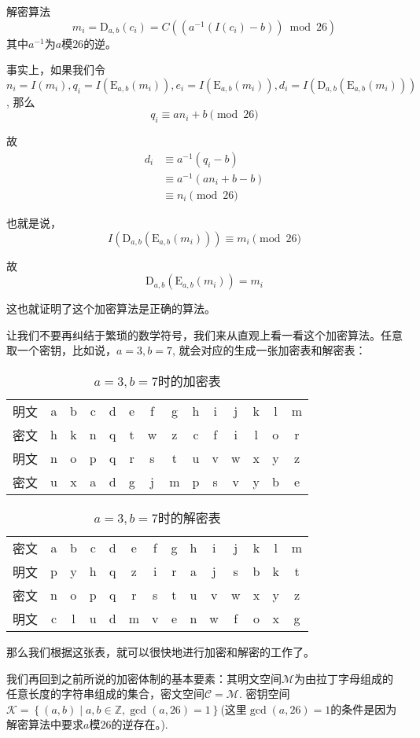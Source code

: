 \documentclass[UTF8]{ctexrep}
\newcommand{\Z}{\mathbb{Z}}
\def\pth#1{\left( {#1}\right)}
\def\brace#1{\left\{ {#1} \right\}}
\def\E#1#2{{\mathrm{E}_{#1}\left({#2}\right)}}
\def\D#1#2{{\mathrm{D}_{#1}\left({#2}\right)}}
\begin{document}
解密算法
\[m_i=\D{a, b}{c_i}=C\pth{\pth{a^{-1}\pth{I\pth{c_i}-b}}\bmod{26}}\]
其中$a^{-1}$为$a$模$26$的逆。\par
事实上，如果我们令$n_i=I\pth{m_i}, q_i=I\pth{\E{a, b}{m_i}}, e_i=I\pth{\E{a, b}{m_i}}, d_i=I\pth{\D{a, b}{\E{a, b}{m_i}}}$, 那么
\[q_i\equiv an_i+b\pmod{26}\]

故
\begin{align*}
    d_i&\equiv a^{-1}\pth{q_i-b}\\
    &\equiv a^{-1}\pth{an_i+b-b}\\
    &\equiv n_i\pmod{26}
\end{align*}

也就是说，
\[I\pth{\D{a, b}{\E{a, b}{m_i}}}\equiv m_i\pmod{26}\]

故
\[\D{a, b}{\E{a, b}{m_i}}=m_i\]

这也就证明了这个加密算法是正确的算法。\par
让我们不要再纠结于繁琐的数学符号，我们来从直观上看一看这个加密算法。任意取一个密钥，比如说，$a=3, b=7$, 就会对应的生成一张加密表和解密表：
\begin{table}[H]
    \centering
    \caption{$a=3, b=7$时的加密表}
    \begin{tabular}{c|c|c|c|c|c|c|c|c|c|c|c|c|c}\hline
        明文&a&b&c&d&e&f&g&h&i&j&k&l&m\\
        密文&h&k&n&q&t&w&z&c&f&i&l&o&r\\\hline
        明文&n&o&p&q&r&s&t&u&v&w&x&y&z\\
        密文&u&x&a&d&g&j&m&p&s&v&y&b&e\\\hline
    \end{tabular}
\end{table}
\begin{table}[H]
    \centering
    \caption{$a=3, b=7$时的解密表}
    \begin{tabular}{c|c|c|c|c|c|c|c|c|c|c|c|c|c}\hline
        密文&a&b&c&d&e&f&g&h&i&j&k&l&m\\
        明文&p&y&h&q&z&i&r&a&j&s&b&k&t\\\hline
        密文&n&o&p&q&r&s&t&u&v&w&x&y&z\\
        明文&c&l&u&d&m&v&e&n&w&f&o&x&g\\\hline
    \end{tabular}
\end{table}

那么我们根据这张表，就可以很快地进行加密和解密的工作了。\par
我们再回到之前所说的加密体制的基本要素：其明文空间$\mathcal{M}$为由拉丁字母组成的任意长度的字符串组成的集合，密文空间$\mathcal{C}=\mathcal{M}$. 密钥空间$\mathcal{K}=\brace{\pth{a, b}\mid a, b\in \Z, \gcd\pth{a ,26}=1}$(这里$\gcd\pth{a, 26}=1$的条件是因为解密算法中要求$a$模$26$的逆存在。).
\end{document}
